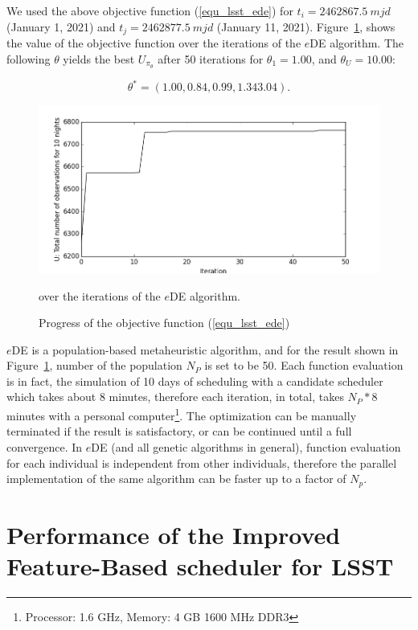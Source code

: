 \documentclass[12pt]{aastex62}
\theoremstyle{definition}
\begin{document}
We used the above objective function (\ref{equ_lsst_ede}) for $t_i = 2462867.5~mjd$ (January 1, 2021) and $t_j = 2462877.5~mjd$ (January 11, 2021). Figure~\ref{fig_eDEObjectiveFunction}, shows the value of the objective function over the iterations of the $e$DE algorithm. The following $\theta$ yields the best $U_{\pi_{\theta}}$ after 50 iterations for $\theta_1 = 1.00$, and $\theta_U = 10.00$:

\begin{equation}
\theta^* = (1.00, 0.84, 0.99,  1.34  3.04).
\end{equation}



\begin{figure}[h!]
\begin{center}
\includegraphics[width=0.5\linewidth]{Figures/eDEObjectiveFunction.png}
\caption{Progress of the objective function (\ref{equ_lsst_ede})} over the iterations of the $e$DE algorithm.
\label{fig_eDEObjectiveFunction}
\end{center}
\end{figure}

$e$DE is a population-based metaheuristic algorithm, and for the result shown in Figure~\ref{fig_eDEObjectiveFunction}, number of the population $N_P$ is set to be 50. Each function evaluation is in fact, the simulation of 10 days of scheduling with a candidate scheduler which takes about 8 minutes, therefore each iteration, in total, takes $N_P * 8$ minutes with a personal computer\footnote{Processor: 1.6 GHz, Memory: 4 GB 1600 MHz DDR3}. The optimization can be manually terminated if the result is satisfactory, or can be continued until a full convergence. In $e$DE (and all genetic algorithms in general), function evaluation for each individual is independent from other individuals, therefore the parallel implementation of the same algorithm can be faster up to a factor of $N_p$. 

 


\section{Performance of the Improved Feature-Based scheduler for LSST}\label{sec_comp}
\end{document}
